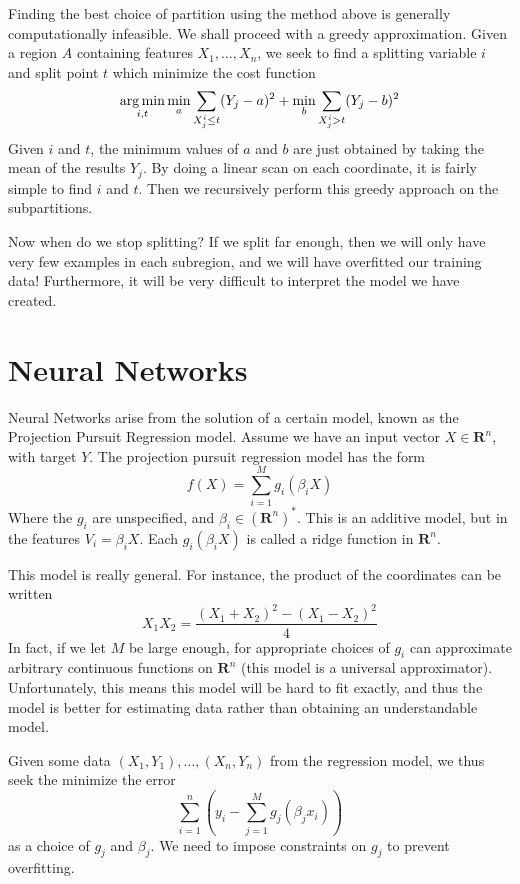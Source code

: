 Finding the best choice of partition using the method above is generally computationally infeasible. We shall proceed with a greedy approximation. Given a region $A$ containing features $X_1, \dots, X_n$, we seek to find a splitting variable $i$ and split point $t$ which minimize the cost function
%
\[ \operatorname*{arg\,min}_{i,t} \min_a \sum_{X_j^i \leq t} (Y_j - a)^2 + \min_b \sum_{X_j^i > t} (Y_j - b)^2 \]
%
Given $i$ and $t$, the minimum values of $a$ and $b$ are just obtained by taking the mean of the results $Y_j$. By doing a linear scan on each coordinate, it is fairly simple to find $i$ and $t$. Then we recursively perform this greedy approach on the subpartitions.

Now when do we stop splitting? If we split far enough, then we will only have very few examples in each subregion, and we will have overfitted our training data! Furthermore, it will be very difficult to interpret the model we have created.

\chapter{Neural Networks}

Neural Networks arise from the solution of a certain model, known as the Projection Pursuit Regression model. Assume we have an input vector $X \in \mathbf{R}^n$, with target $Y$. The projection pursuit regression model has the form
%
\[ f(X) = \sum_{i = 1}^M g_i(\beta_i X) \]
%
Where the $g_i$ are unspecified, and $\beta_i \in (\mathbf{R}^n)^*$. This is an additive model, but in the features $V_i = \beta_i X$. Each $g_i(\beta_i X)$ is called a ridge function in $\mathbf{R}^n$.

This model is really general. For instance, the product of the coordinates can be written
%
\[ X_1X_2 = \frac{(X_1 + X_2)^2 - (X_1 - X_2)^2}{4} \]
%
In fact, if we let $M$ be large enough, for appropriate choices of $g_i$ can approximate arbitrary continuous functions on $\mathbf{R}^n$ (this model is a universal approximator). Unfortunately, this means this model will be hard to fit exactly, and thus the model is better for estimating data rather than obtaining an understandable model.

Given some data $(X_1, Y_1), \dots, (X_n, Y_n)$ from the regression model, we thus seek the minimize the error
%
\[ \sum_{i = 1}^n \left(y_i - \sum_{j = 1}^M g_j(\beta_j x_i) \right) \]
%
as a choice of $g_j$ and $\beta_j$. We need to impose constraints on $g_j$ to prevent overfitting.

